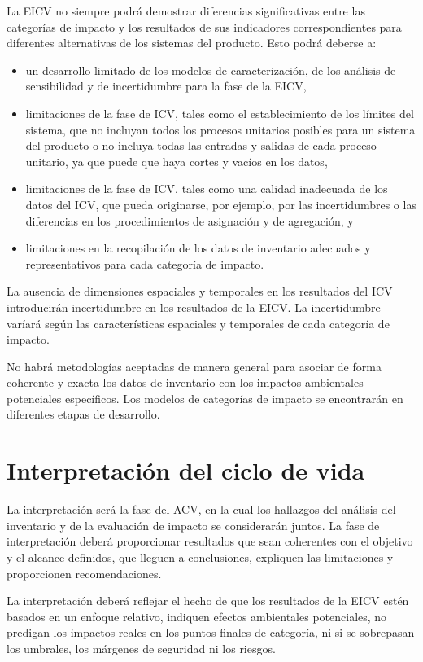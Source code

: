 La EICV no siempre podrá demostrar diferencias significativas entre las categorías de impacto y los resultados de sus indicadores correspondientes para diferentes alternativas de los sistemas del producto. Esto podrá deberse a:
\begin{itemize}
  \item un desarrollo limitado de los modelos de caracterización, de los análisis de sensibilidad y de incertidumbre para la fase de la EICV,
  \item limitaciones de la fase de ICV, tales como el establecimiento de los límites del sistema, que no incluyan todos los procesos unitarios posibles para un sistema del producto o no incluya todas las entradas y salidas de cada proceso unitario, ya que puede que haya cortes y vacíos en los datos,
  \item limitaciones de la fase de ICV, tales como una calidad inadecuada de los datos del ICV, que pueda originarse, por ejemplo, por las incertidumbres o las diferencias en los procedimientos de asignación y de agregación, y
  \item limitaciones en la recopilación de los datos de inventario adecuados y representativos para cada categoría de impacto.
\end{itemize}

La ausencia de dimensiones espaciales y temporales en los resultados del ICV introducirán incertidumbre en los resultados de la EICV. La incertidumbre varíará según las características espaciales y temporales de cada categoría de impacto.

No habrá metodologías aceptadas de manera general para asociar de forma coherente y exacta los datos de inventario con los impactos ambientales potenciales específicos. Los modelos de categorías de impacto se encontrarán en diferentes etapas de desarrollo.



\section{Interpretación del ciclo de vida}

La interpretación será la fase del ACV, en la cual los hallazgos del análisis del inventario y de la evaluación de impacto se considerarán juntos. La fase de interpretación deberá proporcionar resultados que sean coherentes con el objetivo y el alcance definidos, que lleguen a conclusiones, expliquen las limitaciones y proporcionen recomendaciones.

La interpretación deberá reflejar el hecho de que los resultados de la EICV estén basados en un enfoque relativo, indiquen efectos ambientales potenciales, no predigan los impactos reales en los puntos finales de categoría, ni si se sobrepasan los umbrales, los márgenes de seguridad ni los riesgos.

